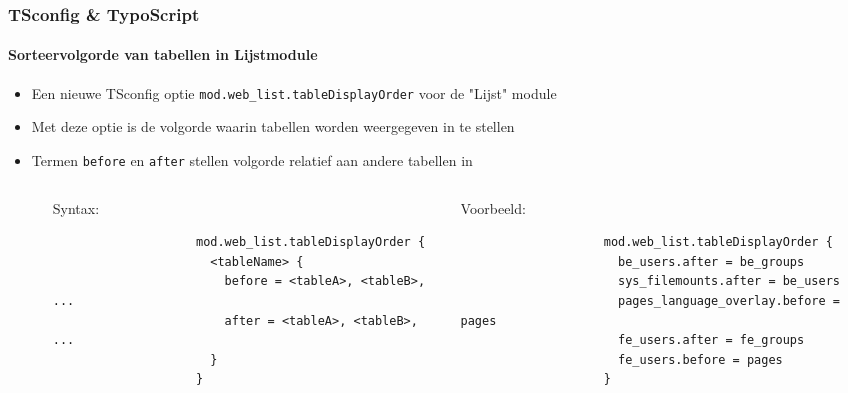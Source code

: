 \begin{frame}[fragile]
	\frametitle{TSconfig \& TypoScript}
	\framesubtitle{Sorteervolgorde van tabellen in Lijstmodule}

	\lstset{basicstyle=\tiny\ttfamily}

	\begin{itemize}

		\item Een nieuwe TSconfig optie \texttt{mod.web\_list.tableDisplayOrder} voor de "Lijst" module

		\item Met deze optie is de volgorde waarin tabellen worden weergegeven in te stellen

		\item Termen \texttt{before} en \texttt{after} stellen volgorde relatief aan andere tabellen in

		\begin{columns}[T]
			\begin{column}{.07\textwidth}
			\end{column}
			\begin{column}{.465\textwidth}

				\small Syntax:\normalsize

				\begin{lstlisting}
					mod.web_list.tableDisplayOrder {
					  <tableName> {
					    before = <tableA>, <tableB>, ...
					    after = <tableA>, <tableB>, ...
					  }
					}
				\end{lstlisting}
			\end{column}
			\begin{column}{.465\textwidth}

				\small Voorbeeld:\normalsize

				\begin{lstlisting}
					mod.web_list.tableDisplayOrder {
					  be_users.after = be_groups
					  sys_filemounts.after = be_users
					  pages_language_overlay.before = pages
					  fe_users.after = fe_groups
					  fe_users.before = pages
					}
				\end{lstlisting}

			\end{column}
		\end{columns}

	\end{itemize}

\end{frame}


